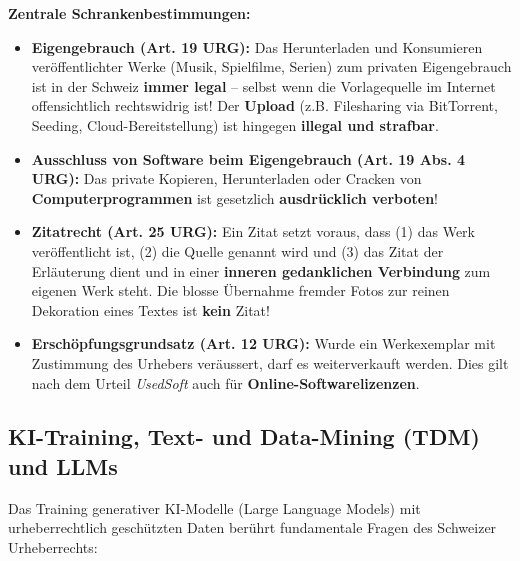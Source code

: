 \begin{definition}
    \textbf{Zentrale Schrankenbestimmungen:}
    \begin{itemize}
        \item \textbf{Eigengebrauch (Art. 19 URG):} Das Herunterladen und Konsumieren veröffentlichter Werke (Musik, Spielfilme, Serien) zum privaten Eigengebrauch ist in der Schweiz \textbf{immer legal} -- selbst wenn die Vorlagequelle im Internet offensichtlich rechtswidrig ist! Der \textbf{Upload} (z.B. Filesharing via BitTorrent, Seeding, Cloud-Bereitstellung) ist hingegen \textbf{illegal und strafbar}.
        \item \textbf{Ausschluss von Software beim Eigengebrauch (Art. 19 Abs. 4 URG):} Das private Kopieren, Herunterladen oder Cracken von \textbf{Computerprogrammen} ist gesetzlich \textbf{ausdrücklich verboten}!
        \item \textbf{Zitatrecht (Art. 25 URG):} Ein Zitat setzt voraus, dass (1) das Werk veröffentlicht ist, (2) die Quelle genannt wird und (3) das Zitat der Erläuterung dient und in einer \textbf{inneren gedanklichen Verbindung} zum eigenen Werk steht. Die blosse Übernahme fremder Fotos zur reinen Dekoration eines Textes ist \textbf{kein} Zitat!
        \item \textbf{Erschöpfungsgrundsatz (Art. 12 URG):} Wurde ein Werkexemplar mit Zustimmung des Urhebers veräussert, darf es weiterverkauft werden. Dies gilt nach dem Urteil \textit{UsedSoft} auch für \textbf{Online-Softwarelizenzen}.
    \end{itemize}
\end{definition}

\subsection{KI-Training, Text- und Data-Mining (TDM) und LLMs}

Das Training generativer KI-Modelle (Large Language Models) mit urheberrechtlich geschützten Daten berührt fundamentale Fragen des Schweizer Urheberrechts:

